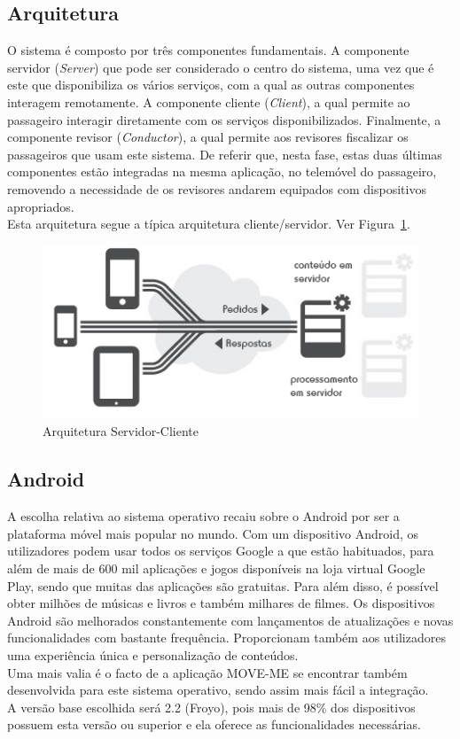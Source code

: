 \documentclass[9pt,a4paper]{extarticle}
\begin{document}
\begin{multicols}{2}
\subsection{Arquitetura}

O sistema é composto por três componentes fundamentais. A componente servidor (\emph{Server}) que pode ser considerado o centro do sistema, uma vez que é este que disponibiliza os vários serviços, com a qual as outras componentes interagem remotamente. A componente cliente (\emph{Client}), a qual permite ao passageiro interagir diretamente com os serviços disponibilizados. Finalmente, a componente revisor (\emph{Conductor}), a qual permite aos revisores fiscalizar os passageiros que usam este sistema. De referir que, nesta fase, estas duas últimas componentes estão integradas na mesma aplicação, no telemóvel do passageiro, removendo a necessidade de os revisores andarem equipados com dispositivos apropriados.
\\Esta arquitetura segue a típica arquitetura cliente/servidor. Ver Figura~\ref{fig:architecture}.

\begin{figure}[H]
\centerline{\includegraphics[scale=0.45]{architecture}}
    \caption{Arquitetura Servidor-Cliente}
    \label{fig:architecture}
\end{figure}

\subsection{Android}

A escolha relativa ao sistema operativo recaiu sobre o Android por ser a plataforma móvel mais popular no mundo. Com um dispositivo Android, os utilizadores podem usar todos os serviços Google a que estão habituados, para além de mais de 600 mil aplicações e jogos disponíveis na loja virtual Google Play, sendo que muitas das aplicações são gratuitas. Para além disso, é possível obter milhões de músicas e livros e também milhares de filmes. Os dispositivos Android são melhorados constantemente com lançamentos de atualizações e novas funcionalidades com bastante frequência. Proporcionam também aos utilizadores uma experiência única e personalização de conteúdos.
\\Uma mais valia é o facto de a aplicação MOVE-ME se encontrar também desenvolvida para este sistema operativo, sendo assim mais fácil a integração.
\\A versão base escolhida será 2.2 (Froyo), pois mais de 98\% dos dispositivos possuem esta versão ou superior e ela oferece as funcionalidades necessárias. \cite{dashboards}


\end{multicols}
\end{document}
